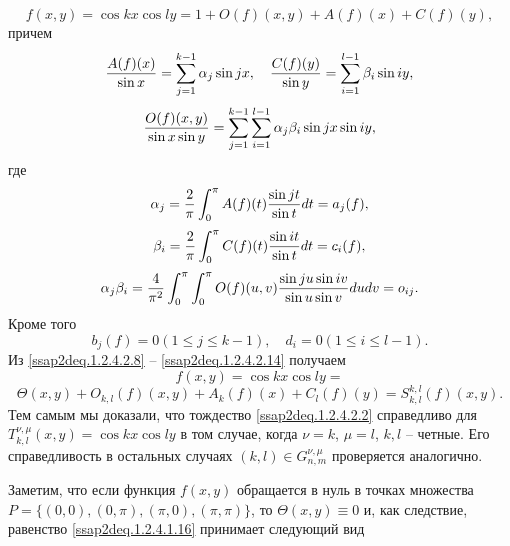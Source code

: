 \begin{equation}\label{ssap2deq.1.2.4.2.8}
f(x,y)=\cos kx\cos ly=1+O(f)(x,y)+A(f)(x)+C(f)(y),
\end{equation}
причем
\begin{equation}\label{ssap2deq.1.2.4.2.9}
{A(f)(x)\over \sin x}=\sum_{j=1}^{k-1}\alpha_j\sin jx,\quad
{C(f)(y)\over \sin y}=\sum_{i=1}^{l-1}\beta_i\sin iy,
\end{equation}
\begin{equation}\label{ssap2deq.1.2.4.2.10}
{O(f)(x,y)\over\sin x \sin y}=\sum_{j=1}^{k-1}\sum_{i=1}^{l-1}\alpha_j\beta_i\sin jx\sin iy,
\end{equation}
где
\begin{equation}\label{ssap2deq.1.2.4.2.11}
\alpha_j=\frac2\pi\int_0^\pi A(f)(t){\sin jt\over\sin t}dt =a_j(f),
\end{equation}
\begin{equation}\label{ssap2deq.1.2.4.2.12}
\beta_i=\frac2\pi\int_0^\pi C(f)(t){\sin it\over\sin t}dt =c_i(f),
\end{equation}
\begin{equation}\label{ssap2deq.1.2.4.2.13}
\alpha_j\beta_i=\frac4{\pi^2}\int_0^\pi \int_0^\pi O(f)(u,v){\sin ju\sin iv\over\sin u\sin v}dudv=o_{ij}.
\end{equation}
Кроме того
\begin{equation}\label{ssap2deq.1.2.4.2.14}
b_j(f)=0(1\le j\le k-1),\quad d_i=0 (1\le i\le l-1).
\end{equation}
Из \eqref{ssap2deq.1.2.4.2.8} -- \eqref{ssap2deq.1.2.4.2.14}  получаем
$$
f(x,y)=\cos kx\cos ly=
$$
$$
\Theta(x,y)+O_{k,l}(f)(x,y)+A_k(f)(x)+C_l(f)(y)=S_{k,l}^{k,l}(f)(x,y).
$$
Тем самым мы доказали, что тождество \eqref{ssap2deq.1.2.4.2.2} справедливо для $T_{k,l}^{\nu,\mu}(x,y)=\cos kx\cos ly$ в том случае, когда $\nu=k$, $\mu=l$,
$k,l$ -- четные. Его справедливость в остальных случаях $(k,l)\in G_{n,m}^{\nu,\mu}$ проверяется аналогично.

Заметим, что если функция $f(x,y)$ обращается в нуль в точках множества \linebreak $P=\{(0,0), (0,\pi),(\pi,0),(\pi,\pi)\}$, то $\Theta(x,y)\equiv0$ и, как следствие, равенство \eqref{ssap2deq.1.2.4.1.16} принимает следующий вид

